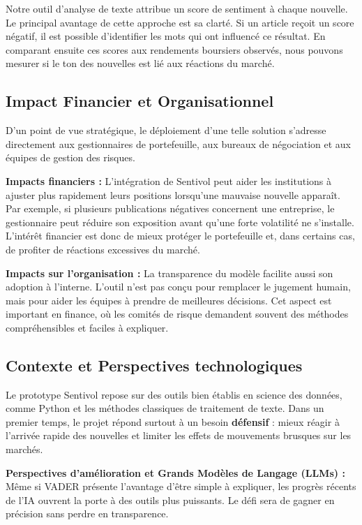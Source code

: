 \documentclass[11pt,a4paper]{article}
\begin{document}
Notre outil d'analyse de texte attribue un score de sentiment à chaque nouvelle. Le principal avantage de cette approche est sa clarté. Si un article reçoit un score négatif, il est possible d'identifier les mots qui ont influencé ce résultat. En comparant ensuite ces scores aux rendements boursiers observés, nous pouvons mesurer si le ton des nouvelles est lié aux réactions du marché.

\subsection{Impact Financier et Organisationnel}
D'un point de vue stratégique, le déploiement d'une telle solution s'adresse directement aux gestionnaires de portefeuille, aux bureaux de négociation et aux équipes de gestion des risques.

\textbf{Impacts financiers :} 
L'intégration de Sentivol peut aider les institutions à ajuster plus rapidement leurs positions lorsqu'une mauvaise nouvelle apparaît. Par exemple, si plusieurs publications négatives concernent une entreprise, le gestionnaire peut réduire son exposition avant qu'une forte volatilité ne s'installe. L'intérêt financier est donc de mieux protéger le portefeuille et, dans certains cas, de profiter de réactions excessives du marché.

\textbf{Impacts sur l'organisation :} 
La transparence du modèle facilite aussi son adoption à l'interne. L'outil n'est pas conçu pour remplacer le jugement humain, mais pour aider les équipes à prendre de meilleures décisions. Cet aspect est important en finance, où les comités de risque demandent souvent des méthodes compréhensibles et faciles à expliquer.

\subsection{Contexte et Perspectives technologiques}
Le prototype Sentivol repose sur des outils bien établis en science des données, comme Python et les méthodes classiques de traitement de texte. Dans un premier temps, le projet répond surtout à un besoin \textbf{défensif} : mieux réagir à l'arrivée rapide des nouvelles et limiter les effets de mouvements brusques sur les marchés.

\textbf{Perspectives d'amélioration et Grands Modèles de Langage (LLMs) :}
Même si VADER présente l'avantage d'être simple à expliquer, les progrès récents de l'IA ouvrent la porte à des outils plus puissants. Le défi sera de gagner en précision sans perdre en transparence. 
\end{document}
